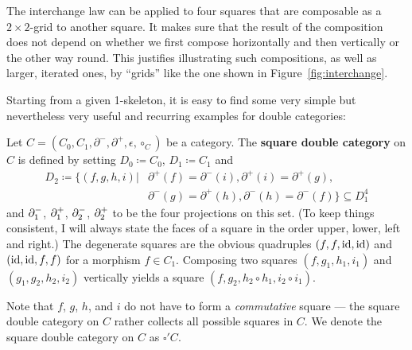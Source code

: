 The interchange law can be applied to four squares that are composable as a 
$2 \times 2$-grid to another square.
It makes sure that the result of the composition does not depend on whether we
first compose horizontally and then vertically or the other way round.
This justifies illustrating such compositions, as well as larger, iterated ones,
by ``grids'' like the one shown in Figure~\ref{fig:interchange}.

Starting from a given 1-skeleton, it is easy to find some very simple
but nevertheless very useful and recurring examples for double categories:

\begin{example} \label{def:sq-dbl-cat}
Let $C = (C_0, C_1, \partial^-, \partial^+, \epsilon, \circ_C)$ be a category. The
\textbf{square double category} on $C$ is defined by setting $D_0 \coloneqq C_0$,
$D_1 \coloneqq C_1$ and
\begin{align*}
D_2 \coloneqq \big\{ (f, g, h, i) \big| &\partial^+(f) = \partial^-(i), 
	\partial^+(i) = \partial^+(g), \\
	&\partial^-(g) = \partial^+(h), 
	\partial^-(h) = \partial^-(f) \big\} \subseteq D_1^4
\end{align*}
and $\partial^-_1$, $\partial^+_1$, $\partial^-_2$, $\partial^+_2$ to be the four projections on
this set. (To keep things consistent, I will always state the faces of a square
in the order upper, lower, left and right.) The degenerate squares are the obvious
quadruples $(f, f, \operatorname{id}, \operatorname{id})$ and $(\operatorname{id}, \operatorname{id}, f, f)$ for a morphism $f \in C_1$.
Composing two squares $(f, g_1, h_1, i_1)$ and $(g_1, g_2, h_2, i_2)$ vertically
yields a square $(f, g_2, h_2 \circ h_1, i_2 \circ i_1)$.

Note that $f$, $g$, $h$, and $i$ do not have to form a \emph{commutative} square ---
the square double category on $C$ rather collects all possible squares in $C$.
We denote the square double category on $C$ as $\square'C$.
\end{example}

